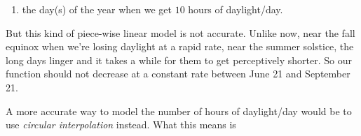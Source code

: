 \documentclass{ximera}
\begin{document}
\begin{example}
\begin{question}
\begin{enumerate}
\item the day(s) of the year when we get $10$ hours of daylight/day.
\end{enumerate}

But this kind of piece-wise linear model is not accurate. Unlike now, near the fall equinox when we're losing daylight at a rapid rate, near the summer solstice, the long days linger and it takes a while for them to get perceptively shorter. So our function should not decrease at a constant rate between June 21 and September 21.

A more accurate way to model the number of hours of daylight/day would be to use \emph{circular interpolation} instead. What this means is   


\end{question}


\end{example}
\end{document}

